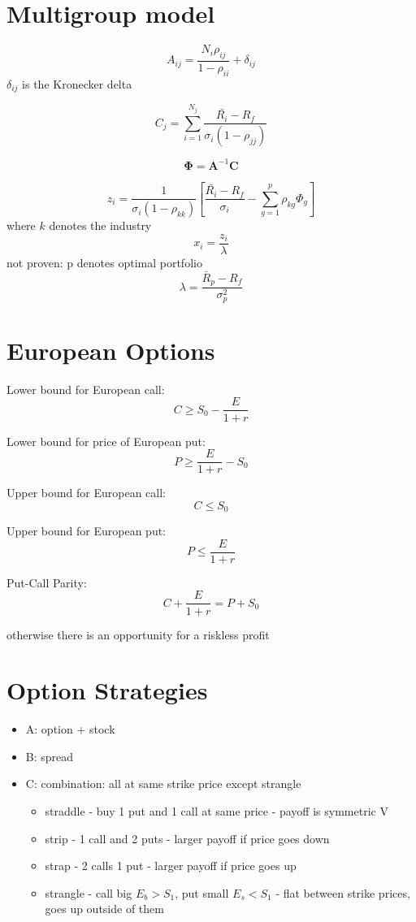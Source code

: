 \documentclass[]{amsart}
\newcommand{\p}[1]{\left(#1\right)}
\newcommand{\bs}[1]{\boldsymbol{#1}}
\begin{document}
\section{Multigroup model}
	
$$ A_{ij} = \frac{N_i \rho_{ij}}{1-\rho_{ii}} + \delta_{ij} $$ 
$\delta_{ij}$ is the Kronecker delta 

$$ C_{j} = \sum_{i=1}^{N_j} \frac{\bar{R_i}-R_f}{\sigma_i \p{1-\rho_{jj}}} $$

$$ \bs{\Phi} = \bs{A}^{-1}\bs{C} $$

$$ z_i = \frac{1}{\sigma_i \p{1-\rho_{kk}}} \left[ \frac{\bar{R_i}-R_f}{\sigma_i} - \sum_{g=1}^p \rho_{kg} \Phi_g \right] $$ 
where $k$ denotes the industry 
$$ x_i = \frac{z_i}{\lambda} $$ 
not proven: p denotes optimal portfolio 
$$ \lambda = \frac{\bar{R}_p-R_f}{\sigma_p^2} $$ 





\section{European Options}
Lower bound for European call:
$$ C \geq S_0 - \frac{E}{1+r} $$ 

Lower bound for price of European put: 
$$ P \geq \frac{E}{1+r} - S_0 $$ 


Upper bound for European call:
$$ C \leq S_0 $$ 

Upper bound for European put: 
$$ P \leq \frac{E}{1+r} $$ 

Put-Call Parity:
$$ C + \frac{E}{1+r} = P + S_0 $$ 

otherwise there is an opportunity for a riskless profit 

\section{Option Strategies}

\begin{itemize}

\item A: option + stock
\item B: spread 
\item C: combination: all at same strike price except strangle 
\begin{itemize}
\item straddle - buy 1 put and 1 call at same price - payoff is symmetric V
\item strip - 1 call and 2 puts - larger payoff if price goes down
\item strap - 2 calls 1 put - larger payoff if price goes up 
\item strangle - call big $E_b>S_1$, put small $E_s<S_1$ - flat between strike prices, goes up outside of them 

\end{itemize}


\end{itemize}
\end{document}
